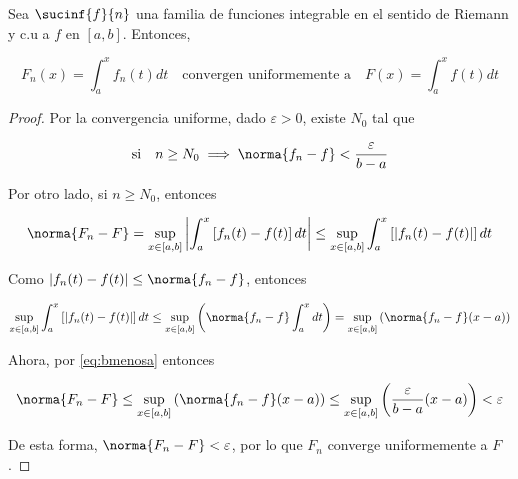 \begin{teo}
    Sea $\sucinf{f}{n}$ una familia de funciones integrable en el sentido de Riemann y c.u a $f$ en $[a,b]$. Entonces,
    
    \[
    F_n(x) = \int_a^x f_n(t)dt \quad \text{convergen uniformemente a} \quad F(x) = \int_a^x f(t)dt
    \]
\end{teo}

\begin{proof}
    Por la convergencia uniforme, dado $\varepsilon > 0$, existe $N_0$ tal que
    
    \begin{equation}\label{eq:bmenosa}
        \text{si} \quad n \geq N_0 \implies \norma{f_n - f} < \frac{\varepsilon}{b-a}
    \end{equation}
    
    Por otro lado, si $n \geq N_0$, entonces
    
    \[
    \norma{F_n - F} = \sup_{x \in [a,b]} \left| \int_a^x \left[f_n(t) - f(t)\right]dt \right| \leq \sup_{x \in [a,b]} \int_a^x \left[ \left| f_n(t) - f(t)\right| \right]dt
    \]
    
    Como $\left| f_n(t) - f(t)\right| \leq \norma{f_n - f}$, entonces
    
    \[
    \sup_{x \in [a,b]} \int_a^x \left[ \left| f_n(t) - f(t)\right| \right]dt \leq \sup_{x \in [a,b]} \left( \norma{f_n - f} \int_a^x dt \right) = \sup_{x \in [a,b]} \left( \norma{f_n - f} (x-a) \right)
    \]
    
    Ahora, por \ref{eq:bmenosa} entonces
    
    \[
    \norma{F_n - F} \leq \sup_{x \in [a,b]} \left( \norma{f_n - f} (x-a) \right) \leq \sup_{x \in [a,b]} \left( \frac{\varepsilon}{b-a} (x-a) \right) < \varepsilon
    \]
    
    De esta forma, $\norma{F_n - F} < \varepsilon$, por lo que $F_n$ converge uniformemente a $F$.
\end{proof}